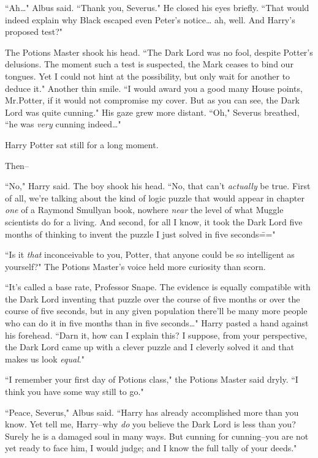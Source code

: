 ``Ah{\ldots}" Albus said. ``Thank you, Severus." He closed his eyes briefly. ``That would indeed explain why Black escaped even Peter's notice{\ldots} ah, well. And Harry's proposed test?"

The Potions Master shook his head. ``The Dark Lord was no fool, despite Potter's delusions. The moment such a test is suspected, the Mark ceases to bind our tongues. Yet I could not hint at the possibility, but only wait for another to deduce it." Another thin smile. ``I would award you a good many House points, Mr.\?Potter, if it would not compromise my cover. But as you can see, the Dark Lord was quite cunning." His gaze grew more distant. ``Oh," Severus breathed, ``he was \emph{very} cunning indeed{\ldots}"

Harry Potter sat still for a long moment.

Then\---

``No," Harry said. The boy shook his head. ``No, that can't \emph{actually} be true. First of all, we're talking about the kind of logic puzzle that would appear in chapter \emph{one} of a Raymond Smullyan book, nowhere \emph{near} the level of what Muggle scientists do for a living. And second, for all I know, it took the Dark Lord five months of thinking to invent the puzzle I just solved in five seconds\==="

``Is it \emph{that} inconceivable to you, Potter, that anyone could be so intelligent as yourself?" The Potions Master's voice held more curiosity than scorn.

``It's called a base rate, Professor Snape. The evidence is equally compatible with the Dark Lord inventing that puzzle over the course of five months or over the course of five seconds, but in any given population there'll be many more people who can do it in five months than in five seconds{\ldots}" Harry pasted a hand against his forehead. ``Darn it, how can I explain this? I suppose, from your perspective, the Dark Lord came up with a clever puzzle and I cleverly solved it and that makes us look \emph{equal}."

``I remember your first day of Potions class," the Potions Master said dryly. ``I think you have some way still to go."

``Peace, Severus," Albus said. ``Harry has already accomplished more than you know. Yet tell me, Harry\---why \emph{do} you believe the Dark Lord is less than you? Surely he is a damaged soul in many ways. But cunning for cunning\---you are not yet ready to face him, I would judge; and I know the full tally of your deeds."

